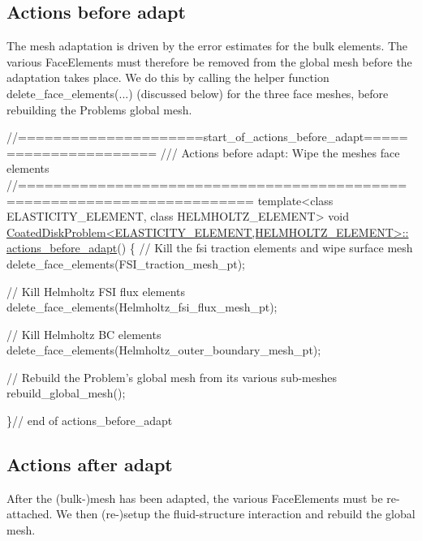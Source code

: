  

\hypertarget{index_before_adapt}{}\subsection{Actions before adapt}\label{index_before_adapt}
The mesh adaptation is driven by the error estimates for the bulk elements. The various {\ttfamily Face\+Elements} must therefore be removed from the global mesh before the adaptation takes place. We do this by calling the helper function {\ttfamily delete\+\_\+face\+\_\+elements}(...) (discussed below) for the three face meshes, before rebuilding the Problem\textquotesingle{}s global mesh.

 
\begin{DoxyCodeInclude}
\textcolor{comment}{//=====================start\_of\_actions\_before\_adapt======================}
\textcolor{comment}{/// Actions before adapt: Wipe the meshes face elements}
\textcolor{comment}{}\textcolor{comment}{//========================================================================}
\textcolor{keyword}{template}<\textcolor{keyword}{class} ELASTICITY\_ELEMENT, \textcolor{keyword}{class} HELMHOLTZ\_ELEMENT>
\textcolor{keywordtype}{void} \hyperlink{classCoatedDiskProblem_a89e972df172b024b1358f0fac7646d6d}{CoatedDiskProblem<ELASTICITY\_ELEMENT,HELMHOLTZ\_ELEMENT>::}
\hyperlink{classCoatedDiskProblem_a89e972df172b024b1358f0fac7646d6d}{actions\_before\_adapt}()
\{
 \textcolor{comment}{// Kill the fsi traction elements and wipe surface mesh}
 delete\_face\_elements(FSI\_traction\_mesh\_pt);
 
 \textcolor{comment}{// Kill Helmholtz FSI flux elements}
 delete\_face\_elements(Helmholtz\_fsi\_flux\_mesh\_pt);
 
 \textcolor{comment}{// Kill Helmholtz BC elements }
 delete\_face\_elements(Helmholtz\_outer\_boundary\_mesh\_pt);
 
 \textcolor{comment}{// Rebuild the Problem's global mesh from its various sub-meshes}
 rebuild\_global\_mesh();

\}\textcolor{comment}{// end of actions\_before\_adapt}

\end{DoxyCodeInclude}




 

\hypertarget{index_after_adapt}{}\subsection{Actions after adapt}\label{index_after_adapt}
After the (bulk-\/)mesh has been adapted, the various {\ttfamily Face\+Elements} must be re-\/attached. We then (re-\/)setup the fluid-\/structure interaction and rebuild the global mesh.

